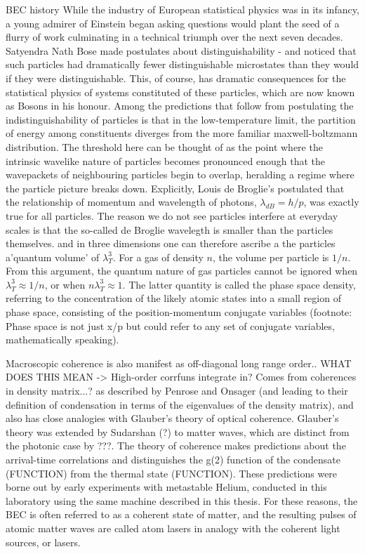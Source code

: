 	BEC history
	While the industry of European statistical physics was in its infancy, a	young admirer of Einstein began asking questions would plant the seed of	a flurry of work culminating in a technical triumph over the next seven	decades.
	Satyendra Nath Bose made postulates about distinguishability -	and noticed that such particles had dramatically fewer distinguishable	microstates than they would if they were distinguishable.
	This, of	course, has dramatic consequences for the statistical physics of systems	constituted of these particles, which are now known as Bosons in his	honour.
	Among the predictions that follow from postulating the	indistinguishability of particles is that in the low-temperature limit,	the partition of energy among constituents diverges from the more familiar maxwell-boltzmann distribution.
	The threshold here can be thought of as	the point where the intrinsic wavelike nature of particles becomes	pronounced enough that the wavepackets of neighbouring particles begin	to overlap, heralding a regime where the particle picture breaks down.	Explicitly, Louis de Broglie's postulated that the relationship of	momentum and wavelength of photons, $\lambda_{dB} = h/p$, was exactly	true for all particles.
	The reason we do not see particles interfere at	everyday scales is that the so-called de Broglie wavelegth is smaller	than the particles themselves.
	and in three dimensions one can therefore ascribe a the particles	a'quantum volume' of $\lambda_T^3$.
	For a gas of density $n$, the	volume per particle is $1/n$.
	From this argument, the quantum nature	of gas particles cannot be ignored when $\lambda_T^3 \approx 1/n$,	or when $n\lambda_T^3\approx 1$.
	The latter quantity is called the	phase space density, referring to the concentration of the likely atomic	states into a small region of phase space, consisting of the	position-momentum conjugate variables (footnote: Phase space is not just	x/p but could refer to any set of conjugate variables, mathematically	speaking).

	Macroscopic coherence is also manifest as off-diagonal long range order.. WHAT DOES THIS MEAN -> High-order corrfuns integrate in?
	Comes from coherences in density matrix...? as described by Penrose and Onsager (and leading	to their definition of condensation in terms of the eigenvalues of the	density matrix), and also has close analogies with Glauber's theory of	optical coherence.
	Glauber's theory was extended by Sudarshan (?) to	matter waves, which are distinct from the photonic case by ???.
	The	theory of coherence makes predictions about the arrival-time	correlations and distinguishes the g(2) function of the condensate	(FUNCTION) from the thermal state (FUNCTION).
	These predictions were	borne out by early experiments with metastable Helium, conducted in this	laboratory using the same machine described in this thesis.
	For these	reasons, the BEC is often referred to as a coherent state of matter, and	the resulting pulses of atomic matter waves are called atom lasers in	analogy with the coherent light sources, or lasers.

